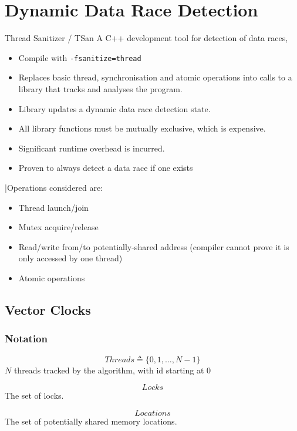 \chapter{Dynamic Data Race Detection}

\begin{definitionbox}{Thread Sanitizer / TSan}
    A C++ development tool for detection of data races,
    \begin{itemize}
        \item Compile with \texttt{-fsanitize=thread}
        \item Replaces basic thread, synchronisation and atomic operations into calls to a library that tracks and analyses the program.
        \item Library updates a dynamic data race detection state.
        \item All library functions must be mutually exclusive, which is expensive.
        \item Significant runtime overhead is incurred.
        \item Proven to always detect a data race if one exists
    \end{itemize}
    |Operations considered are:
    \begin{itemize}
        \item Thread launch/join
        \item Mutex acquire/release
        \item Read/write from/to potentially-shared address (compiler cannot prove it is only accessed by one thread)
        \item Atomic operations
    \end{itemize}
\end{definitionbox}

\section{Vector Clocks}
\subsection{Notation}
\begin{minipage}{.33\textwidth}
    \[Threads \triangleq \{0,1,\dots, N-1\}\]
    \center
    $N$ threads tracked by the algorithm, with id starting at $0$
\end{minipage}
\begin{minipage}{.33\textwidth}
    \[Locks\]
    \center
    The set of locks.
\end{minipage}
\begin{minipage}{.33\textwidth}
    \[Locations\]
    \center
    The set of potentially shared memory locations.
\end{minipage}


